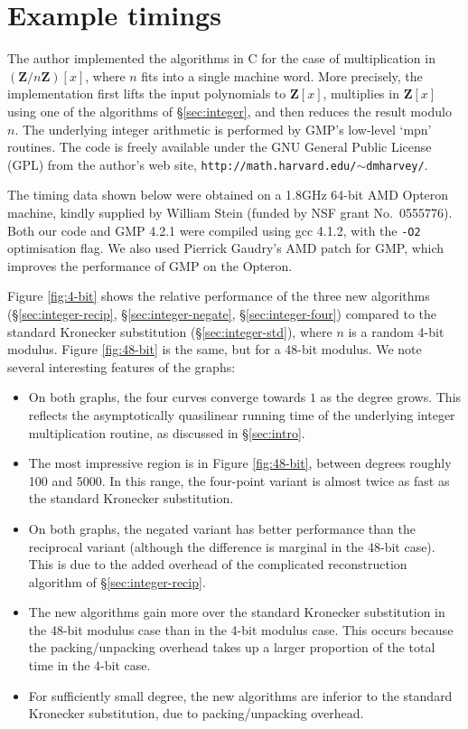 \documentclass{amsart}
\newcommand{\ZZ}{\mathbf{Z}}
\theoremstyle{definition}
\theoremstyle{remark}
\begin{document}
\section{Example timings}
\label{sec:demo}

The author implemented the algorithms in C for the case of multiplication in $(\ZZ/n\ZZ)[x]$, where $n$ fits into a single machine word. More precisely, the implementation first lifts the input polynomials to $\ZZ[x]$, multiplies in $\ZZ[x]$ using one of the algorithms of \S\ref{sec:integer}, and then reduces the result modulo $n$. The underlying integer arithmetic is performed by GMP's low-level `mpn' routines. The code is freely available under the GNU General Public License (GPL) from the author's web site, \texttt{http://math.harvard.edu/$\sim$dmharvey/}.

The timing data shown below were obtained on a 1.8GHz 64-bit AMD Opteron machine, kindly supplied by William Stein (funded by NSF grant No.~0555776). Both our code and GMP 4.2.1 were compiled using gcc 4.1.2, with the \texttt{-O2} optimisation flag. We also used Pierrick Gaudry's AMD patch for GMP, which improves the performance of GMP on the Opteron.

Figure \ref{fig:4-bit} shows the relative performance of the three new algorithms (\S\ref{sec:integer-recip}, \S\ref{sec:integer-negate}, \S\ref{sec:integer-four}) compared to the standard Kronecker substitution (\S\ref{sec:integer-std}), where $n$ is a random 4-bit modulus. Figure \ref{fig:48-bit} is the same, but for a 48-bit modulus. We note several interesting features of the graphs:

\begin{itemize}
\item On both graphs, the four curves converge towards $1$ as the degree grows. This reflects the asymptotically quasilinear running time of the underlying integer multiplication routine, as discussed in \S\ref{sec:intro}.
\item The most impressive region is in Figure \ref{fig:48-bit}, between degrees roughly 100 and 5000. In this range, the four-point variant is almost twice as fast as the standard Kronecker substitution.
\item On both graphs, the negated variant has better performance than the reciprocal variant (although the difference is marginal in the 48-bit case). This is due to the added overhead of the complicated reconstruction algorithm of \S\ref{sec:integer-recip}.
\item The new algorithms gain more over the standard Kronecker substitution in the 48-bit modulus case than in the 4-bit modulus case. This occurs because the packing/unpacking overhead takes up a larger proportion of the total time in the 4-bit case.
\item For sufficiently small degree, the new algorithms are inferior to the standard Kronecker substitution, due to packing/unpacking overhead.
\end{itemize}
\end{document}
